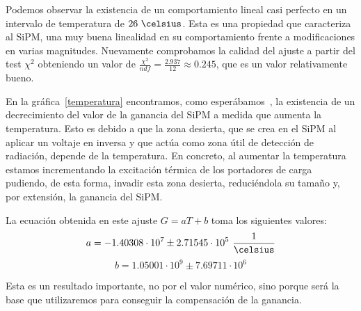 \begin{itemize}
Podemos observar la existencia de un comportamiento lineal casi perfecto en un intervalo de temperatura de $26~\celsius$. Esta es una propiedad que caracteriza al SiPM, una muy buena linealidad en su comportamiento frente a modificaciones en varias magnitudes. Nuevamente comprobamos la calidad del ajuste a partir del test $\chi^2$ obteniendo un valor de $\frac{\chi^2}{ndf}=\frac{2.937}{12}\approx 0.245$, que es un valor relativamente bueno.

En la gráfica~\ref{temperatura} encontramos, como esperábamos~\cite{tesisSiPM}, la existencia de un decrecimiento del valor de la ganancia del SiPM a medida que aumenta la temperatura. Esto es debido a que la zona desierta, que se crea en el SiPM al aplicar un voltaje en inversa y que actúa como zona útil de detección de radiación, depende de la temperatura. En concreto, al aumentar la temperatura estamos incrementando la excitación térmica de los portadores de carga pudiendo, de esta forma, invadir esta zona desierta, reduciéndola su tamaño y, por extensión, la ganancia del SiPM.

La ecuación obtenida en este ajuste $G=aT+b$ toma los siguientes valores: 
\begin{equation}
a=-1.40308 \cdot 10^7 \pm 2.71545 \cdot 10^5~\frac{1}{\celsius}
\label{ajustependientetemperatura}
\end{equation}
\begin{equation}
b=1.05001 \cdot 10^9 \pm 7.69711 \cdot 10^6
\label{ajusteordenadatemperatura}
\end{equation}


Esta es un resultado importante, no por el valor numérico, sino porque será la base que utilizaremos para conseguir la compensación de la ganancia.
\end{itemize}